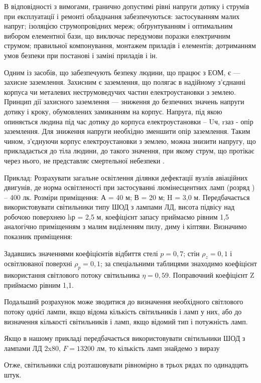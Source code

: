 В відповідності з вимогами, гранично допустимі рівні напруги дотику і струмів при експлуатації і ремонті обладнання забезпечуються: застосуванням малих напруг; ізоляцією струмопровідних мереж; 
обґрунтуванням і оптимальним вибором елементної бази, що виключає передумови поразки електричним струмом; правильної компонування, монтажем приладів і елементів; дотриманням умов безпеки при постанові і заміні приладів і ін.

Одним із засобів, що забезпечують безпеку людини, що працює з ЕОМ, є --- захисне заземлення. Захисним є заземлення, що полягає в надійному з'єднанні  корпуса чи  металевих неструмоведучих частин електроустановки з землею. Принцип дії захисного заземлення --- зниження до безпечних значень напруги дотику і кроку, обумовлених замиканням на корпус. Напруга, під якою опиняється людина під час  дотику до корпуса електроустановки – Uч, rзаз - опір заземлення. Для зниження напруги необхідно зменшити опір заземлення. Таким чином, з'єднуючи корпус електроустановки з землею, можна знизити напругу, що прикладається до тіла людини, до такого значення, при якому струм, що протікає через нього, не представляє  смертельної небезпеки .

Приклад: Розрахувати загальне освітлення ділянки дефектації вузлів авіаційних двигунів, де норма освітленості при застосуванні люмінесцентних ламп (розряд ) – 400 лк. Розміри приміщення: А = 40 м; В = 20 м; H = 3,0 м. Передбачається використовувати світильники типу ШОД з лампами ЛД, висота підвісу над робочою поверхнею hр = 2,5 м, коефіцієнт запасу приймаємо рівним 1,5 аналогічно приміщенням з малим виділенням пилу, диму і кіптяви.
Визначимо показник приміщення:

Задавшись значеннями коефіцієнтів відбиття стелі $p = 0,7$; стін $\rho_z = 0,1$ і освітлюваної поверхні $\rho_p = 0,1$; за спеціальними таблицями знаходимо коефіцієнт використання світлового потоку світильника $\eta = 0,59$. Поправочний коефіцієнт Z приймаємо рівним 1,1.

Подальший розрахунок може зводитися до визначення необхідного світлового потоку однієї лампи, якщо відома кількість світильників і ламп у них, або до визначення кількості світильників і ламп, якщо відомий тип і потужність ламп.

Якщо в нашому прикладі передбачається використовувати світильники ШОД з лампами ЛД 2x80, $F = 13200$ лм, то кількість ламп знайдемо з виразу

Отже, світильники слід розташовувати рівномірно в трьох рядах по одинадцять штук.

